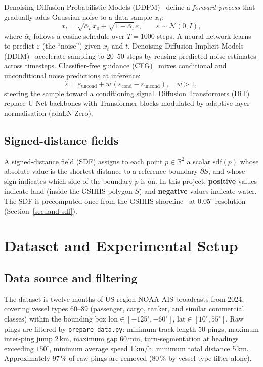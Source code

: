 \documentclass[11pt,a4paper]{article}
\begin{document}
Denoising Diffusion Probabilistic Models (DDPM)~\cite{ho2020denoising} define a
\emph{forward process} that gradually adds Gaussian noise to a data sample $x_0$:
\[
  x_t = \sqrt{\bar\alpha_t}\, x_0 + \sqrt{1-\bar\alpha_t}\,\varepsilon,
  \qquad \varepsilon \sim \mathcal{N}(0,I),
\]
where $\bar\alpha_t$ follows a cosine schedule over $T=1000$ steps.
A neural network learns to predict $\varepsilon$ (the ``noise'') given $x_t$ and $t$.
Denoising Diffusion Implicit Models (DDIM)~\cite{song2021ddim} accelerate sampling
to 20--50 steps by reusing predicted-noise estimates across timesteps.
Classifier-free guidance (CFG)~\cite{ho2022classifier} mixes conditional and
unconditional noise predictions at inference:
\[
  \hat\varepsilon = \varepsilon_\text{uncond} + w\,(\varepsilon_\text{cond} -
                   \varepsilon_\text{uncond}), \quad w > 1,
\]
steering the sample toward a conditioning signal.
Diffusion Transformers (DiT)~\cite{peebles2023dit} replace U-Net backbones with
Transformer blocks modulated by adaptive layer normalisation (adaLN-Zero).

\subsection{Signed-distance fields}

A signed-distance field (SDF) assigns to each point $p \in \mathbb{R}^2$ a scalar
$\text{sdf}(p)$ whose absolute value is the shortest distance to a reference
boundary $\partial S$, and whose sign indicates which side of the boundary $p$ is on.
In this project, \textbf{positive} values indicate land (inside the GSHHS polygon $S$)
and \textbf{negative} values indicate water.
The SDF is precomputed once from the GSHHS shoreline~\cite{wessel1996gshhs} at
$0.05^\circ$ resolution (Section~\ref{sec:land-sdf}).

\section{Dataset and Experimental Setup}
\label{sec:setup}

\subsection{Data source and filtering}

The dataset is twelve months of US-region NOAA AIS broadcasts from 2024,
covering vessel types 60--89 (passenger, cargo, tanker, and similar commercial
classes) within the bounding box
$\text{lon} \in [-125^\circ, -60^\circ]$,
$\text{lat} \in [10^\circ, 55^\circ]$.
Raw pings are filtered by \texttt{prepare\_data.py}: minimum track length 50 pings,
maximum inter-ping jump 2\,km, maximum gap 60\,min,
turn-segmentation at headings exceeding $150^\circ$, minimum average speed
1\,km/h, minimum total distance 5\,km.
Approximately 97\,\% of raw pings are removed (80\,\% by vessel-type filter alone).
\end{document}
